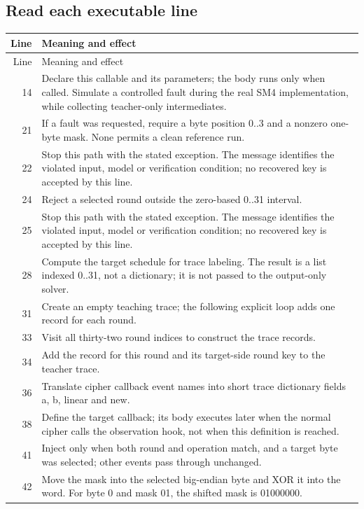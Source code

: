 \subsection*{Read each executable line}
\begingroup\small\begin{longtable}{r >{\raggedright\arraybackslash}p{138mm}}\toprule Line&Meaning and effect\\\midrule\endfirsthead\toprule Line&Meaning and effect\\\midrule\endhead
14&Declare this callable and its parameters; the body runs only when called. Simulate a controlled fault during the real SM4 implementation, while collecting teacher-only intermediates.\\
21&If a fault was requested, require a byte position 0..3 and a nonzero one-byte mask. None permits a clean reference run.\\
22&Stop this path with the stated exception. The message identifies the violated input, model or verification condition; no recovered key is accepted by this line.\\
24&Reject a selected round outside the zero-based 0..31 interval.\\
25&Stop this path with the stated exception. The message identifies the violated input, model or verification condition; no recovered key is accepted by this line.\\
28&Compute the target schedule for trace labeling. The result is a list indexed 0..31, not a dictionary; it is not passed to the output-only solver.\\
31&Create an empty teaching trace; the following explicit loop adds one record for each round.\\
33&Visit all thirty-two round indices to construct the trace records.\\
34&Add the record for this round and its target-side round key to the teacher trace.\\
36&Translate cipher callback event names into short trace dictionary fields a, b, linear and new.\\
38&Define the target callback; its body executes later when the normal cipher calls the observation hook, not when this definition is reached.\\
41&Inject only when both round and operation match, and a target byte was selected; other events pass through unchanged.\\
42&Move the mask into the selected big-endian byte and XOR it into the word. For byte 0 and mask 01, the shifted mask is 01000000.\\

\end{longtable}
